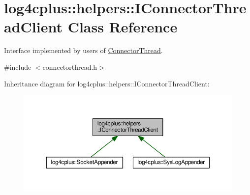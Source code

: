 \hypertarget{classlog4cplus_1_1helpers_1_1IConnectorThreadClient}{\section{log4cplus\-:\-:helpers\-:\-:I\-Connector\-Thread\-Client Class Reference}
\label{classlog4cplus_1_1helpers_1_1IConnectorThreadClient}
}


Interface implemented by users of \hyperlink{classlog4cplus_1_1helpers_1_1ConnectorThread}{Connector\-Thread}.  




{\ttfamily \#include $<$connectorthread.\-h$>$}



Inheritance diagram for log4cplus\-:\-:helpers\-:\-:I\-Connector\-Thread\-Client\-:
\nopagebreak
\begin{figure}[H]
\begin{center}
\leavevmode
\includegraphics[width=350pt]{classlog4cplus_1_1helpers_1_1IConnectorThreadClient__inherit__graph}
\end{center}
\end{figure}
